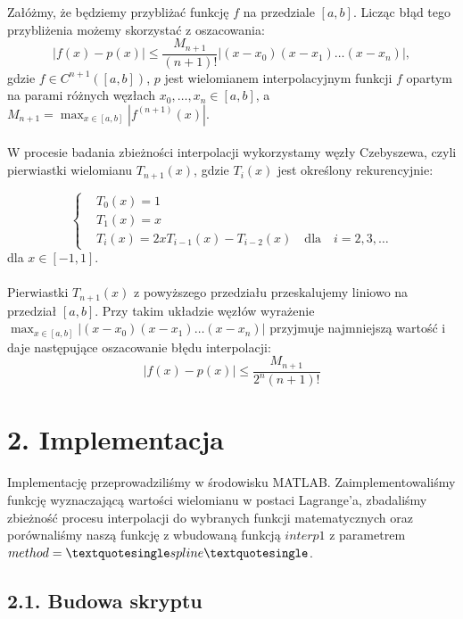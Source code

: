 \documentclass{article}
\begin{document}
	Załóżmy, że będziemy przybliżać funkcję $f$ na przedziale $[a, b]$.
	Licząc błąd tego przybliżenia możemy skorzystać z oszacowania:
	\begin{equation}
		|f(x) - p(x)| \leq \frac{M_{n+1}}{(n + 1)!} \left|(x - x_0)(x - x_1) \ldots (x - x_n)\right|, 
	\end{equation}
	gdzie $f \in C^{n+1}([a, b])$, $p$ jest wielomianem interpolacyjnym funkcji $f$ opartym na parami różnych węzłach $x_0, \ldots, x_n \in [a, b]$, a $M_{n+1} = \max_{x \in [a, b]} |f^{(n+1)}(x)|$.\\\\
	W procesie badania zbieżności interpolacji wykorzystamy węzły Czebyszewa, czyli pierwiastki wielomianu $T_{n+1}(x)$, gdzie $T_i(x)$ jest określony rekurencyjnie:

	\begin{equation*}
	\left\lbrace
	\begin{aligned}
		& T_0(x) = 1 \\
		& T_1(x) = x \\
		& T_i(x) = 2xT_{i-1}(x)-T_{i-2}(x) \quad \text{dla} \quad i = 2, 3, \ldots
	\end{aligned}
	\right.
	\end{equation*}
	dla $x \in [-1, 1]$.\\\\
	Pierwiastki $T_{n+1}(x)$ z powyższego przedziału przeskalujemy liniowo na przedział $[a, b]$. Przy takim układzie węzłów wyrażenie $\max_{x \in [a, b]} |(x-x_0)(x-x_1)\ldots(x-x_n)|$ przyjmuje najmniejszą wartość i daje następujące oszacowanie błędu interpolacji:
	\begin{equation}
		|f(x) - p(x)| \leq \frac{M_{n+1}}{2^n (n + 1)!}
	\end{equation}
	
	\section*{2. Implementacja}
	
	Implementację przeprowadziliśmy w środowisku MATLAB. Zaimplementowaliśmy funkcję wyznaczającą wartości wielomianu w postaci Lagrange'a, zbadaliśmy zbieżność procesu interpolacji do wybranych funkcji matematycznych oraz porównaliśmy naszą funkcję z wbudowaną funkcją $interp1$ z parametrem $method=\textquotesingle spline \textquotesingle$.
	
	\subsection*{2.1. Budowa skryptu}
	
\end{document}
